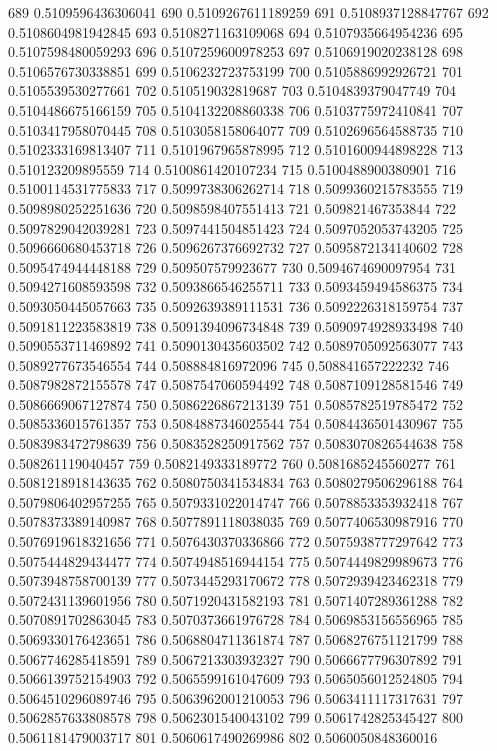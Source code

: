 689 0.5109596436306041
690 0.5109267611189259
691 0.5108937128847767
692 0.5108604981942845
693 0.5108271163109068
694 0.5107935664954236
695 0.5107598480059293
696 0.5107259600978253
697 0.5106919020238128
698 0.5106576730338851
699 0.5106232723753199
700 0.5105886992926721
701 0.5105539530277661
702 0.510519032819687
703 0.5104839379047749
704 0.5104486675166159
705 0.5104132208860338
706 0.5103775972410841
707 0.5103417958070445
708 0.5103058158064077
709 0.5102696564588735
710 0.5102333169813407
711 0.5101967965878995
712 0.5101600944898228
713 0.510123209895559
714 0.5100861420107234
715 0.5100488900380901
716 0.5100114531775833
717 0.5099738306262714
718 0.5099360215783555
719 0.5098980252251636
720 0.5098598407551413
721 0.509821467353844
722 0.5097829042039281
723 0.5097441504851423
724 0.5097052053743205
725 0.5096660680453718
726 0.5096267376692732
727 0.5095872134140602
728 0.5095474944448188
729 0.509507579923677
730 0.5094674690097954
731 0.5094271608593598
732 0.5093866546255711
733 0.5093459494586375
734 0.5093050445057663
735 0.5092639389111531
736 0.5092226318159754
737 0.5091811223583819
738 0.5091394096734848
739 0.5090974928933498
740 0.5090553711469892
741 0.5090130435603502
742 0.5089705092563077
743 0.5089277673546554
744 0.508884816972096
745 0.508841657222232
746 0.5087982872155578
747 0.5087547060594492
748 0.5087109128581546
749 0.5086669067127874
750 0.5086226867213139
751 0.5085782519785472
752 0.5085336015761357
753 0.5084887346025544
754 0.5084436501430967
755 0.5083983472798639
756 0.5083528250917562
757 0.5083070826544638
758 0.508261119040457
759 0.5082149333189772
760 0.5081685245560277
761 0.5081218918143635
762 0.5080750341534834
763 0.5080279506296188
764 0.5079806402957255
765 0.5079331022014747
766 0.5078853353932418
767 0.5078373389140987
768 0.5077891118038035
769 0.5077406530987916
770 0.5076919618321656
771 0.5076430370336866
772 0.5075938777297642
773 0.5075444829434477
774 0.5074948516944154
775 0.5074449829989673
776 0.5073948758700139
777 0.5073445293170672
778 0.5072939423462318
779 0.5072431139601956
780 0.5071920431582193
781 0.5071407289361288
782 0.5070891702863045
783 0.5070373661976728
784 0.5069853156556965
785 0.5069330176423651
786 0.5068804711361874
787 0.5068276751121799
788 0.5067746285418591
789 0.5067213303932327
790 0.5066677796307892
791 0.5066139752154903
792 0.5065599161047609
793 0.5065056012524805
794 0.5064510296089746
795 0.5063962001210053
796 0.5063411117317631
797 0.5062857633808578
798 0.5062301540043102
799 0.5061742825345427
800 0.5061181479003717
801 0.5060617490269986
802 0.5060050848360016
